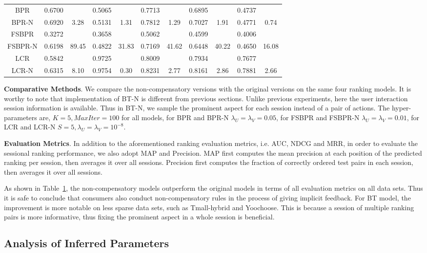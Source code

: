 \documentclass[letterpaper]{article} %
\begin{document}
\begin{table}[ht]
{\begin{tabular}{c cc |cc |cc|cc|cc}
BPR&	0.6700	&&	0.5065	&&	0.7713&&		0.6895	&&	0.4737&\\	
BPR-N	&0.6920	&3.28&	0.5131	&1.31&	0.7812&	1.29&	0.7027	&1.91&	0.4771	&0.74\\
FSBPR	&0.3272 	&&	0.3658 	&&	0.5062 	&&	0.4599 	&&	0.4006 	&\\
FSBPR-N	&0.6198 &	89.45&	0.4822 &	31.83&	0.7169& 	41.62&	0.6448 &	40.22&	0.4650 &	16.08\\
LCR	&0.5842 	&&	0.9725 	&&	0.8009 &&		0.7934 	&&	0.7677 	&\\
LCR-N&	0.6315 &	8.10&	0.9754 &	0.30&	0.8231 &	2.77&	0.8161 &	2.86&	0.7881 &	2.66	\\
\hline
\end{tabular}}
\label{tab:gradedresult}
\end{table}

\textbf{Comparative Methods}. We compare the non-compensatory versions with the original versions on the same four ranking models. It is worthy to note that implementation of BT-N is different from previous sections. Unlike previous experiments, here the user interaction session information is available. Thus in BT-N, we sample the prominent aspect for each session instead of a pair of actions. The hyper-parameters are, $K=5, MaxIter=100$ for all models, for BPR and BPR-N $\lambda_U=\lambda_V=0.05$, for FSBPR and FSBPR-N $\lambda_U=\lambda_V=0.01$, for LCR and LCR-N $S=5, \lambda_U=\lambda_V=10^{-8}$.  

\textbf{Evaluation Metrics}.  In addition to the aforementioned  ranking evaluation metrics, i.e. AUC, NDCG and MRR, in order to evaluate the sessional ranking performance, we also adopt  MAP and Precision. MAP first computes the mean precision at each position of the predicted ranking per session, then averages it over all sessions. Precision first computes the fraction of correctly ordered test pairs in each session, then averages it over all sessions. 

As shown in Table~\ref{tab:gradedresult}, the non-compensatory models outperform the original models in terms of all evaluation metrics on all data sets. Thus it is safe to conclude that consumers also conduct non-compensatory rules in the process of giving implicit feedback. For BT model, the improvement is more notable on less sparse data sets, such as Tmall-hybrid and Yoochoose. This is because a session of multiple ranking pairs is more informative, thus fixing the prominent aspect in a whole session is beneficial.

\subsection{Analysis of Inferred Parameters}
\end{document}
